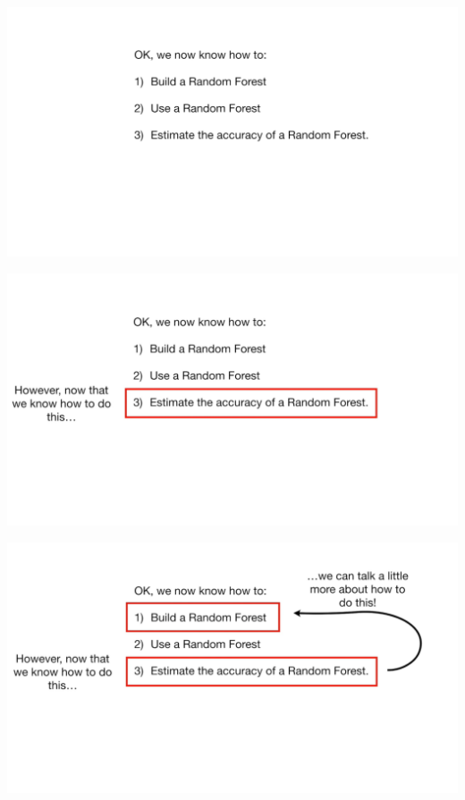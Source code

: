 \documentclass[
  ignorenonframetext,
]{beamer}
\begin{document}
\begin{frame}{}
\protect\hypertarget{section-86}{}
\includegraphics{images/r87.png}
\end{frame}

\begin{frame}{}
\protect\hypertarget{section-87}{}
\includegraphics{images/r88.png}
\end{frame}

\begin{frame}{}
\protect\hypertarget{section-88}{}
\includegraphics{images/r89.png}
\end{frame}
\end{document}
